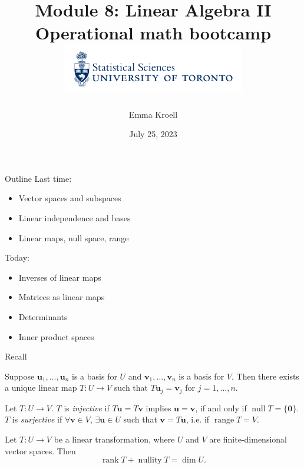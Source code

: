 \documentclass [aspectratio=169]{beamer}
\title[]{Module 8: Linear Algebra II \\ {\large Operational math bootcamp}\\ \includegraphics[width=8cm]{dept_logo.png}\vspace{-1em}}
\author[]{Emma Kroell}
\institute[]{University of Toronto}
\date{July 25, 2023}
\newcommand{\bu}{{\mathbf{u}}}
\newcommand{\bv}{{\mathbf{v}}}
\newcommand{\zerovec}{{\mathbf{0}}}
\DeclareMathOperator{\range}{range}
\DeclareMathOperator{\rank}{rank}
\DeclareMathOperator{\nullspace}{null}
\DeclareMathOperator{\nullity}{nullity}
\begin{document}
{
\begin{frame}
    \titlepage
\end{frame}
}

\begin{frame}{Outline}
Last time:
    \begin{itemize}
      \setlength\itemsep{0.5em}
      \item Vector spaces and subspaces
    	\item Linear independence and bases
	\item Linear maps, null space, range
    \end{itemize}
    
\vspace{1em}

Today:
    \begin{itemize}
      \setlength\itemsep{0.5em}
      \item Inverses of linear maps
      	\item Matrices as linear maps
    	\item Determinants
	\item Inner product spaces
    \end{itemize}
\end{frame}


\begin{frame}{Recall}
\begin{theorem}
Suppose $\bu_1, \ldots, \bu_n$ is a basis for $U$ and $\bv_1, \ldots, \bv_n$ is a basis for $V$. Then there exists a unique linear map $T:U \to V$ such that $T \bu_j = \bv_j$ for $j=1,\ldots, n$.
\end{theorem}

\begin{definition}
Let $T:U \to V$. $T$ is \emph{injective} if $T\bu = T\bv$ implies $\bu = \bv$, if and only if $\nullspace T = \{ \zerovec \}$. $T$ is \emph{surjective} if $\forall \bv \in V, \, \exists \bu \in U$ such that $\bv = T\bu$, i.e. if $\range T = V$.
\end{definition}



\begin{theorem}
Let $T:U \to V$ be a linear transformation, where $U$ and $V$ are finite-dimensional vector spaces. Then  
\begin{equation*}
\rank T + \nullity  T = \dim U.
\end{equation*}
\end{theorem}
\end{frame}
\end{document}
